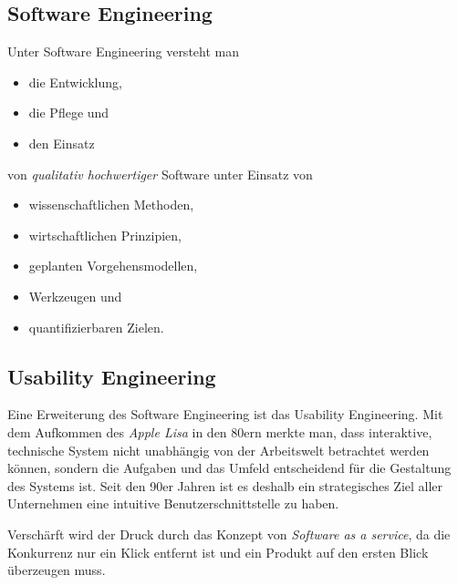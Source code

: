 \documentclass[../main.tex]{subfiles}
\begin{document}
        \subsection{Software Engineering}
            Unter Software Engineering versteht man
            
            \begin{itemize}
                \item die Entwicklung,
                \item die Pflege und
                \item den Einsatz
            \end{itemize}
            von \emph{qualitativ hochwertiger} Software unter Einsatz von
            
            \begin{itemize}
                \item wissenschaftlichen Methoden,
                \item wirtschaftlichen Prinzipien,
                \item geplanten Vorgehensmodellen,
                \item Werkzeugen und
                \item quantifizierbaren Zielen.
            \end{itemize}
            
        \subsection{Usability Engineering}
            Eine Erweiterung des Software Engineering ist das Usability Engineering. Mit dem Aufkommen des \emph{Apple Lisa} in den 80ern merkte man, dass interaktive, technische System nicht unabhängig von der Arbeitswelt betrachtet werden können, sondern die Aufgaben und das Umfeld entscheidend für die Gestaltung des Systems ist. Seit den 90er Jahren ist es deshalb ein strategisches Ziel aller Unternehmen eine intuitive Benutzerschnittstelle zu haben.
                
            Verschärft wird der Druck durch das Konzept von \emph{Software as a service}, da die Konkurrenz nur ein Klick entfernt ist und ein Produkt auf den ersten Blick überzeugen muss.
\end{document}
